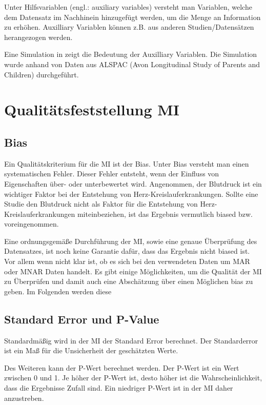 Unter Hilfsvariablen (engl.: auxiliary variables) versteht man Variablen, welche dem Datensatz im Nachhinein hinzugefügt werden, 
um die Menge an Information zu erhöhen. Auxilliary Variablen können z.B. aus anderen Studien/Datensätzen 
herangezogen werden.

Eine Simulation in \textcite[]{Madley-Dowd2019} zeigt die Bedeutung der Auxilliary Variablen. 
Die Simulation wurde anhand von Daten aus ALSPAC (Avon Longitudinal Study of Parents and Children) 
durchgeführt.


\section{Qualitätsfeststellung MI}
\label{section:qualtity}

\subsection{Bias}

Ein Qualitätskriterium für die MI ist der Bias. Unter Bias versteht man einen systematischen Fehler. Dieser Fehler entsteht, 
wenn der Einfluss von Eigenschaften über- oder unterbewertet wird. \autocite[2]{Jakobsen2017} Angenommen, der Blutdruck 
ist ein wichtiger Faktor bei der Entstehung von Herz-Kreislauferkrankungen. Sollte eine Studie den Blutdruck nicht als Faktor 
für die Entstehung von Herz-Kreislauferkrankungen miteinbeziehen, ist das Ergebnis vermutlich biased bzw. voreingenommen.

Eine ordnungsgemäße Durchführung der MI, sowie eine genaue Überprüfung des Datensatzes, ist noch keine Garantie dafür, 
dass das Ergebnis nicht biased ist. Vor allem wenn nicht klar ist, ob es sich bei den verwendeten Daten um MAR oder MNAR 
Daten handelt. Es gibt einige Möglichkeiten, um die Qualität der MI zu Überprüfen und damit auch eine Abschätzung über einen 
Möglichen bias zu geben. Im Folgenden werden diese 

\subsection{Standard Error und P-Value}

Standardmäßig wird in der MI der Standard Error berechnet. Der Standarderror ist ein Maß für die Unsicherheit der 
geschätzten Werte. \autocite[1098]{Donders2006} 

Des Weiteren kann der P-Wert berechnet werden. Der P-Wert ist ein Wert zwischen 0 und 1. Je höher der P-Wert ist, 
desto höher ist die Wahrscheinlichkeit, dass die Ergebnisse Zufall sind. Ein niedriger 
P-Wert ist in der MI daher anzustreben. 


